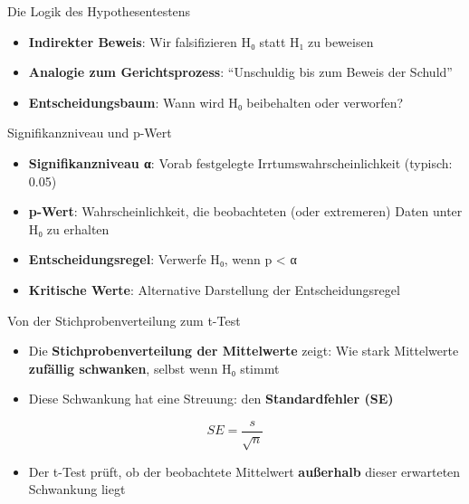 \documentclass[
  ignorenonframetext,
]{beamer}
\providecommand{\tightlist}{%
  \setlength{\itemsep}{0pt}\setlength{\parskip}{0pt}}
\begin{document}
\begin{frame}{Die Logik des Hypothesentestens}
\protect{}\label{die-logik-des-hypothesentestens}
\begin{itemize}
\tightlist
\item
  \textbf{Indirekter Beweis}: Wir falsifizieren H₀ statt H₁ zu beweisen
\item
  \textbf{Analogie zum Gerichtsprozess}: ``Unschuldig bis zum Beweis der
  Schuld''
\item
  \textbf{Entscheidungsbaum}: Wann wird H₀ beibehalten oder verworfen?
\end{itemize}
\end{frame}

\begin{frame}{Signifikanzniveau und p-Wert}
\protect{}\label{signifikanzniveau-und-p-wert}
\begin{itemize}
\tightlist
\item
  \textbf{Signifikanzniveau α}: Vorab festgelegte
  Irrtumswahrscheinlichkeit (typisch: 0.05)
\item
  \textbf{p-Wert}: Wahrscheinlichkeit, die beobachteten (oder
  extremeren) Daten unter H₀ zu erhalten
\item
  \textbf{Entscheidungsregel}: Verwerfe H₀, wenn p \textless{} α
\item
  \textbf{Kritische Werte}: Alternative Darstellung der
  Entscheidungsregel
\end{itemize}
\end{frame}

\begin{frame}{Von der Stichprobenverteilung zum t-Test}
\protect{}\label{von-der-stichprobenverteilung-zum-t-test}
\begin{itemize}
\tightlist
\item
  Die \textbf{Stichprobenverteilung der Mittelwerte} zeigt: Wie stark
  Mittelwerte \textbf{zufällig schwanken}, selbst wenn H₀ stimmt
\item
  Diese Schwankung hat eine Streuung: den \textbf{Standardfehler (SE)}
\end{itemize}

\[ SE = \frac{s}{\sqrt{n}} \]

\begin{itemize}
\tightlist
\item
  Der t-Test prüft, ob der beobachtete Mittelwert \textbf{außerhalb}
  dieser erwarteten Schwankung liegt
\end{itemize}
\end{frame}
\end{document}

